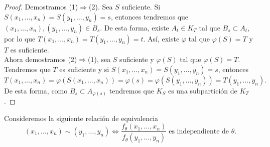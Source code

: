 \begin{proof}
Demostramos (1)$\displaystyle \Rightarrow $(2). Sea $\displaystyle S $ suficiente. Si $\displaystyle S\left(x_{1}, \ldots, x_{n}\right)=S\left(y_{1}, \ldots, y_{n}\right)=s $, entonces tendremos que $\displaystyle \left(x_{1}, \ldots, x_{n}\right), \left(y_{1}, \ldots, y_{n}\right)\in B_{s} $. De esta forma, existe $\displaystyle A_{t} \in K_{T} $ tal que $\displaystyle B_{s}\subset A_{t} $, por lo que $\displaystyle T\left(x_{1}, \ldots, x_{n}\right)=T\left(y_{1}, \ldots, y_{n}\right)=t $. Así, existe $\displaystyle \varphi $ tal que $\displaystyle \varphi\left(S\right)=T $ y $\displaystyle T $ es suficiente. \\
Ahora demostramos (2)$\displaystyle \Rightarrow $(1), sea $\displaystyle S $ suficiente y $\displaystyle \varphi\left(S\right) $ tal que $\displaystyle \varphi\left(S\right)=T $. Tendremos que $\displaystyle T $ es suficiente y si $\displaystyle S\left(x_{1}, \ldots, x_{n}\right)=S\left(y_{1}, \ldots, y_{n}\right)=s $, entonces 
\[T\left(x_{1}, \ldots, x_{n}\right)=\varphi\left(S\left(x_{1}, \ldots, x_{n}\right)\right)=\varphi\left(s\right)=\varphi\left(S\left(y_{1}, \ldots, y_{n}\right)\right)=T\left(y_{1}, \ldots, y_{n}\right) .\]
De esta forma, como $\displaystyle B_{s}\subset A_{\varphi\left(s\right)} $ tendremos que $\displaystyle K_{S} $ es una subpartición de $\displaystyle K_{T} $. 
\end{proof}
Consideremos la siguiente relación de equivalencia
\[\left(x_{1}, \ldots, x_{n}\right)\sim \left(y_{1}, \ldots, y_{n}\right) \iff \frac{f_{\theta}\left(x_{1}, \ldots, x_{n}\right)}{f_{\theta}\left(y_{1}, \ldots, y_{n}\right)} \; \text{es independiente de }\theta.\]

